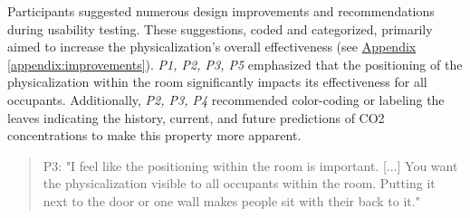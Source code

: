Participants suggested numerous design improvements and recommendations during usability testing. These suggestions, coded and categorized, primarily aimed to increase the physicalization's overall effectiveness (see \hyperref[appendix:improvements]{Appendix \ref*{appendix:improvements}}). \textit{P1, P2, P3, P5} emphasized that the positioning of the physicalization within the room significantly impacts its effectiveness for all occupants. Additionally, \textit{P2, P3, P4} recommended color-coding or labeling the leaves indicating the history, current, and future predictions of CO2 concentrations to make this property more apparent.

\begin{quote}
P3: "I feel like the positioning within the room is important. [...] You want the physicalization visible to all occupants within the room. Putting it next to the door or one wall makes people sit with their back to it."
\end{quote}